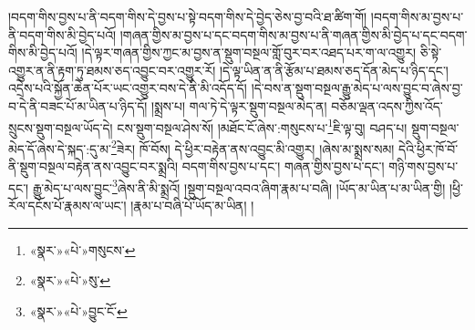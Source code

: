 །བདག་གིས་བྱས་པ་ནི་བདག་གིས་དེ་བྱས་པ་སྟེ་བདག་གིས་དེ་བྱེད་ཅེས་བྱ་བའི་ཐ་ཚིག་གོ། །བདག་གིས་མ་བྱས་པ་ནི་བདག་གིས་མི་བྱེད་པའོ། །གཞན་གྱིས་མ་བྱས་པ་དང་བདག་གིས་མ་བྱས་པ་ནི་གཞན་གྱིས་མི་བྱེད་པ་དང་བདག་གིས་མི་བྱེད་པའོ། །དེ་ལྟར་གཞན་གྱིས་ཀྱང་མ་བྱས་ན་སྡུག་བསྔལ་གློ་བུར་བར་འཐད་པར་ག་ལ་འགྱུར། ཅི་སྟེ་འགྱུར་ན་ནི་རྟག་ཏུ་ཐམས་ཅད་འབྱུང་བར་འགྱུར་རོ། །དེ་ལྟ་ཡིན་ན་ནི་རྩོམ་པ་ཐམས་ཅད་དོན་མེད་པ་ཉིད་དང་། འདྲེས་པའི་སྐྱོན་ཆེན་པོར་ཡང་འགྱུར་བས་དེ་ནི་མི་འདོད་དོ། །དེ་བས་ན་སྡུག་བསྔལ་རྒྱུ་མེད་པ་ལས་བྱུང་བ་ཞེས་བྱ་བ་དེ་ནི་བཟང་པོ་མ་ཡིན་པ་ཉིད་དོ། །སྨྲས་པ། གལ་ཏེ་དེ་ལྟར་སྡུག་བསྔལ་མེད་ན། བཅོམ་ལྡན་འདས་ཀྱིས་འོད་སྲུངས་སྡུག་བསྔལ་ཡོད་དེ། ངས་སྡུག་བསྔལ་ཤེས་སོ། །མཐོང་ངོ་ཞེས་:གསུངས་པ་\footnote{«སྣར་»«པེ་»གསུངས་}ཇི་ལྟ་བུ། བཤད་པ། སྡུག་བསྔལ་མེད་དོ་ཞེས་དེ་སྐད་:དུ་མ་\footnote{«སྣར་»«པེ་»སུ་}ཟེར། ཁོ་བོས། དེ་ཕྱིར་བརྟེན་ནས་འབྱུང་མི་འགྱུར། །ཞེས་མ་སྨྲས་སམ། དེའི་ཕྱིར་ཁོ་བོ་ནི་སྡུག་བསྔལ་བརྟེན་ནས་འབྱུང་བར་སྨྲའི། བདག་གིས་བྱས་པ་དང་། གཞན་གྱིས་བྱས་པ་དང་། གཉི་གས་བྱས་པ་དང་། རྒྱུ་མེད་པ་ལས་བྱུང་\footnote{«སྣར་»«པེ་»བྱུང་ངོ་}ཞེས་ནི་མི་སྨྲའོ། །སྡུག་བསྔལ་འབའ་ཞིག་རྣམ་པ་བཞི། །ཡོད་མ་ཡིན་པ་མ་ཡིན་གྱི། །ཕྱི་རོལ་དངོས་པོ་རྣམས་ལ་ཡང་། །རྣམ་པ་བཞི་པོ་ཡོད་མ་ཡིན། །
